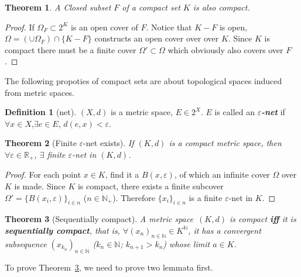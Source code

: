 \documentclass[openany]{book}
\newcommand*{\indexbf}[1]{\emph{\textbf{#1}}\index{#1}} %
\theoremstyle{plain}
\newtheorem{theorem}{Theorem}[section] %
\theoremstyle{definition}
\newtheorem{definition}{Definition}[section] %
\newcommand{\emphbf}[1]{\emph{\textbf{#1}}}
\begin{document}
\begin{theorem}\label{theorem: closed subset of compact set}
	A Closed subset $F$ of a compact set $K$ is also compact.
\end{theorem}
\begin{proof}
	If $\varOmega_F \subset 2^K$ is an open cover of $F$. 
	Notice that $K - F$ is open, $\varOmega = (\cup \varOmega_F) \cap \{K - F\}$ constructs an open cover over over $K$. 
	Since $K$ is compact there must be a finite cover $\varOmega' \subset \varOmega$ which obviously also covers over $F$.
\end{proof}

The following propoties of compact sets are about topological spaces induced from metric spaces.

\begin{definition}[net]\label{defintion: e-net}
	$(X, d)$ is a metric space, $E \in 2^X$. 
	$E$ is called an \indexbf{$\varepsilon$-net} if $\forall x \in X$,$\exists e \in E$, $d(e, x) < \varepsilon$.
\end{definition}

\begin{theorem}[Finite $\varepsilon$-net exists]\label{theorem: finite e-net exists (metric, compact)}
	If $(K, d)$ is a compact metric space, then $\forall \varepsilon \in \mathbb R_+$, $\exists$ \emph{finite} $\varepsilon$-net in $(K, d)$. 
\end{theorem}
\begin{proof}
	For each point $x\in K$, find it a $B(x,\varepsilon)$, of which an infinite cover $\Omega$ over $K$ is made. 
	Since $K$ is compact, there exists a finite subcover $\varOmega' = \{B(x_i,\varepsilon)\}_{i \in n}$ ($n \in \mathbb N_+$). Therefore $\{x_i\}_{i \in n}$ is a finite $\varepsilon$-net in $K$.
\end{proof}

\begin{theorem}[Sequentially compact]\label{theorem: sequentially compact iff compact (metric)}
	A metric space~$(K, d)$ is compact \emphbf{iff} it is \indexbf{sequentially compact}, 
	that is, $\forall (x_n)_{n \in \mathbb N} \in K^\mathbb N$, it has a convergent subsequence $(x_{k_n})_{n \in \mathbb N}$ 
		($k_n \in \mathbb N$; $k_{n+1} > k_n$)
	whose limit $a \in K$.
\end{theorem}

To prove Theorem~\ref{theorem: sequentially compact iff compact (metric)}, we need to prove two lemmata first.
\end{document}
